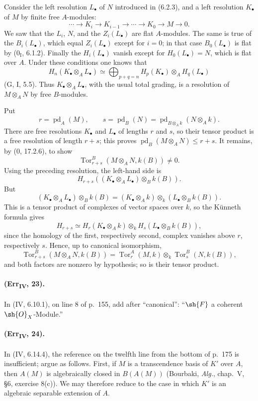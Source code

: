 Consider the left resolution $L_\bullet$ of $N$ introduced in (6.2.3),
and a left resolution $K_\bullet$ of $M$ by finite free $A$-modules:
\[
 \cdots\longrightarrow K_i\longrightarrow K_{i-1}\longrightarrow
 \cdots\longrightarrow K_0\longrightarrow M\longrightarrow0.
\]
We saw that the $L_i$, $N$, and the $Z_i(L_\bullet)$ are flat
$A$-modules.  The same is true of the $B_i(L_\bullet)$, which equal
$Z_i(L_\bullet)$ except for $i=0$; in that case $B_0(L_\bullet)$ is flat
by ($0_{\mathrm I}$, 6.1.2).  Finally the $H_i(L_\bullet)$ vanish except
for $H_0(L_\bullet)=N$, which is flat over $A$.  Under these conditions
one knows that
\[
 H_n(K_\bullet\otimes_AL_\bullet)\simeq
 \bigoplus_{p+q=n}H_p(K_\bullet)\otimes_AH_q(L_\bullet)
\]
(G, I, 5.5).  Thus $K_\bullet\otimes_AL_\bullet$, with the usual total
grading, is a resolution of $M\otimes_AN$ by free $B$-modules.

Put
\[
 r=\operatorname{pd}_A(M),\qquad
 s=\operatorname{pd}_B(N)=
   \operatorname{pd}_{B\otimes_Ak}(N\otimes_Ak).
\]
There are free resolutions $K_\bullet$ and $L_\bullet$ of lengths $r$
and $s$, so their tensor product is a free resolution of length $r+s$;
this proves
$\operatorname{pd}_B(M\otimes_AN)\leq r+s$.  It remains, by
($0$, 17.2.6), to show
\[
 \operatorname{Tor}^{B}_{r+s}(M\otimes_AN,k(B))\neq0.
\]
Using the preceding resolution, the left-hand side is
\[
 H_{r+s}((K_\bullet\otimes_AL_\bullet)\otimes_Bk(B)).
\]
But
\[
 (K_\bullet\otimes_AL_\bullet)\otimes_Bk(B)
 = (K_\bullet\otimes_Ak)\otimes_k
   (L_\bullet\otimes_Bk(B)).
\]
This is a tensor product of complexes of vector spaces over $k$, so the
K\"unneth formula gives
\[
 H_{r+s}\simeq H_r(K_\bullet\otimes_Ak)\otimes_k
 H_s(L_\bullet\otimes_Bk(B)),
\]
since the homology of the first, respectively second, complex vanishes
above $r$, respectively $s$.  Hence, up to canonical isomorphism,
\[
 \operatorname{Tor}^{B}_{r+s}(M\otimes_AN,k(B))=
 \operatorname{Tor}^{A}_{r}(M,k)\otimes_k
 \operatorname{Tor}^{B}_{s}(N,k(B)),
\]
and both factors are nonzero by hypothesis; so is their tensor product.

\paragraph{(Err\textsubscript{IV}, 23).}
In (IV, 6.10.1), on line 8 of p.~155, add after ``canonical'':
``$\sh{F}$ a coherent $\sh{O}_X$-Module.''

\paragraph{(Err\textsubscript{IV}, 24).}
In (IV, 6.14.4), the reference on the twelfth line from the bottom of
p.~175 is insufficient; argue as follows.  First, if $M$ is a
transcendence basis of $K'$ over $A$, then $A(M)$ is algebraically closed
in $B(A(M))$ (Bourbaki, \emph{Alg.}, chap.~V, \S6, exercise 8(c)).  We
may therefore reduce to the case in which $K'$ is an algebraic separable
extension of $A$.

